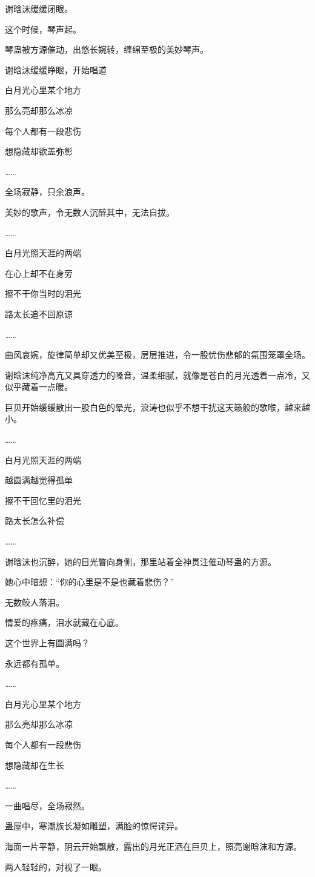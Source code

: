 \begin{this_body}
谢晗沫缓缓闭眼。

这个时候，琴声起。

琴蛊被方源催动，出悠长婉转，缠绵至极的美妙琴声。

谢晗沫缓缓睁眼，开始唱道

白月光心里某个地方

那么亮却那么冰凉

每个人都有一段悲伤

想隐藏却欲盖弥彰

……

全场寂静，只余浪声。

美妙的歌声，令无数人沉醉其中，无法自拔。

……

白月光照天涯的两端

在心上却不在身旁

擦不干你当时的泪光

路太长追不回原谅

……

曲风哀婉，旋律简单却又优美至极，层层推进，令一股忧伤悲郁的氛围笼罩全场。

谢晗沫纯净高亢又具穿透力的嗓音，温柔细腻，就像是苍白的月光透着一点冷，又似乎藏着一点暖。

巨贝开始缓缓散出一股白色的晕光，浪涛也似乎不想干扰这天籁般的歌喉，越来越小。

……

白月光照天涯的两端

越圆满越觉得孤单

擦不干回忆里的泪光

路太长怎么补偿

……

谢晗沫也沉醉，她的目光瞥向身侧，那里站着全神贯注催动琴蛊的方源。

她心中暗想：“你的心里是不是也藏着悲伤？”

无数鲛人落泪。

情爱的疼痛，泪水就藏在心底。

这个世界上有圆满吗？

永远都有孤单。

……

白月光心里某个地方

那么亮却那么冰凉

每个人都有一段悲伤

想隐藏却在生长

……

一曲唱尽，全场寂然。

蛊屋中，寒潮族长凝如雕塑，满脸的惊愕诧异。

海面一片平静，阴云开始飘散，露出的月光正洒在巨贝上，照亮谢晗沫和方源。

两人轻轻的，对视了一眼。

\end{this_body}

